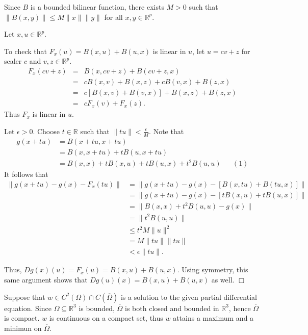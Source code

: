 \documentclass[11pt]{article}
\begin{document}
\vspace{.2in}

\noindent Since $B$ is a bounded bilinear function, there exists $M>0$ such that $\|B(x,y)\|\leq M\|x\|\|y\|$ for all $x,y\in\mathbb{R}^p$.
\vspace{.2in}

\noindent Let $x,u\in\mathbb{R}^p$.
\vspace{.2in}

\noindent {} To check that $F_x(u)=B(x,u)+B(u,x)$ is linear in $u$, let $u=cv+z$ for scaler $c$ and $v,z\in\mathbb{R}^p$.
\begin{eqnarray*}
F_x(cv+z)&=&B(x,cv+z)+B(cv+z,x)\\&=&cB(x,v)+B(x,z)+cB(v,x)+B(z,x)\\&=&c\left[B(x,v)+B(v,x)\right]+B(x,z)+B(z,x)\\&=&cF_x(v)+F_x(z).
\end{eqnarray*}
\noindent Thus $F_x$ is linear in $u$.

\vspace{.2in}

\noindent Let $\epsilon>0$. Choose $t\in\mathbb{R}$ such that $\|tu\|<\frac{\epsilon}{M}$. Note that
\begin{align*}
g(x+tu)&=B(x+tu,x+tu)\\&=B(x,x+tu)+tB(u,x+tu)\\&=B(x,x)+tB(x,u)+tB(u,x)+t^2B(u,u)&&(1)
\end{align*}
\noindent It follows that
\begin{align*}
\|g(x+tu)-g(x)-F_x(tu)\|&=\|g(x+tu)-g(x)-\left[B(x,tu)+B(tu,x)\right]\|\\&=\|g(x+tu)-g(x)-\left[tB(x,u)+tB(u,x)\right]\|\\&=\|B(x,x)+t^2B(u,u)-g(x)\|\\&=\|t^2B(u,u)\|\\&\leq t^2M\|u\|^2\\&=M\|tu\|\|tu\|\\&<\epsilon\|tu\|.
\end{align*}

\noindent Thus, $Dg(x)(u)=F_x(u)=B(x,u)+B(u,x)$. Using symmetry, this same argument shows that $Dg(u)(x)=B(x,u)+B(u,x)$ as well. \hfill $\Box$

\vspace{.2in}

\noindent 

\vspace{.5in}

\noindent {\bf [4]} Suppose that $w\in C^2(\Omega)\cap C(\overline{\Omega})$ is a solution to the given partial differential equation. Since $\Omega\subseteq\mathbb{R}^3$ is bounded,  $\overline{\Omega}$ is both closed and bounded in $\mathbb{R}^3$, hence $\overline{\Omega}$ is compact. $w$ is continuous on a compact set, thus $w$ attains a maximum and a minimun on $\overline{\Omega}$.
\end{document}

